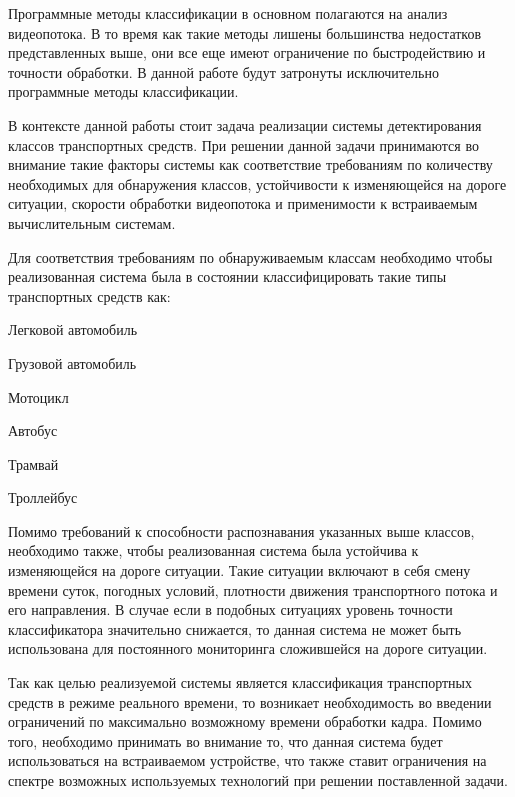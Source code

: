 Программные методы классификации в основном полагаются на анализ видеопотока. В то время как такие методы лишены большинства недостатков представленных выше, они все еще имеют ограничение по быстродействию и точности обработки. В данной работе будут затронуты исключительно программные методы классификации.

В контексте данной работы стоит задача реализации системы детектирования классов транспортных средств. При решении данной задачи принимаются во внимание такие факторы системы как соответствие требованиям по количеству необходимых для обнаружения классов, устойчивости к изменяющейся на дороге ситуации, скорости обработки видеопотока и применимости к встраиваемым вычислительным системам.
	
Для соответствия требованиям по обнаруживаемым классам необходимо чтобы реализованная система была в состоянии классифицировать такие типы транспортных средств как:
%
\begin{itemize*}
  \item Легковой автомобиль
  \item Грузовой автомобиль 
  \item Мотоцикл
  \item Автобус
  \item Трамвай
  \item Троллейбус  
\end{itemize*}
%

Помимо требований к способности распознавания указанных выше классов, необходимо также, чтобы реализованная система была устойчива к изменяющейся на дороге ситуации. Такие ситуации включают в себя смену времени суток, погодных условий, плотности движения транспортного потока и его направления. В случае если в подобных ситуациях уровень точности классификатора значительно снижается, то данная система не может быть использована для постоянного мониторинга сложившейся на дороге ситуации. 

Так как целью реализуемой системы является классификация транспортных средств в режиме реального времени, то возникает необходимость во введении ограничений по максимально возможному времени обработки кадра. Помимо того, необходимо принимать во внимание то, что данная система будет использоваться на встраиваемом устройстве, что также ставит ограничения на спектре возможных используемых технологий при решении поставленной задачи.
